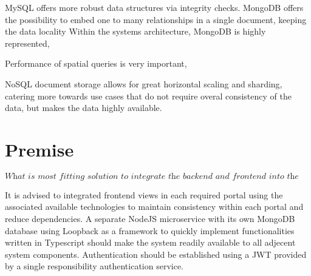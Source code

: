 MySQL offers more robust data structures via integrity checks. MongoDB offers the possibility to embed one to many relationships in a single document, keeping the data locality
Within the systems architecture, MongoDB is highly represented,




Performance of spatial queries is very important,


NoSQL document storage allows for great horizontal scaling and sharding, catering more towards use cases that do not require overal consistency of the data, but makes the data highly available.


%
\section{Premise}
\[\textit{What is most fitting solution to integrate the backend and frontend into the existing architecture?}\] \hfill

It is advised to integrated frontend views in each required portal using the associated available technologies to maintain consistency within each portal and reduce dependencies. A separate NodeJS microservice with its own MongoDB database using Loopback as a framework to quickly implement functionalities written in Typescript should make the system readily available to all adjecent system components. Authentication should be established using a JWT provided by a single responsibility authentication service.
